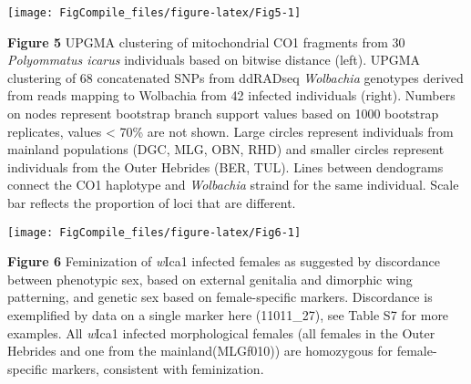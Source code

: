 \documentclass[12pt,]{article}
\begin{document}
\pagebreak

\begin{center}\texttt{[image: FigCompile\_files/figure-latex/Fig5-1]} \end{center}

\textbf{Figure 5} UPGMA clustering of mitochondrial CO1 fragments from
30 \emph{Polyommatus icarus} individuals based on bitwise distance
(left). UPGMA clustering of 68 concatenated SNPs from ddRADseq
\emph{Wolbachia} genotypes derived from reads mapping to Wolbachia from
42 infected individuals (right). Numbers on nodes represent bootstrap
branch support values based on 1000 bootstrap replicates, values
\textless{} 70\% are not shown. Large circles represent individuals from
mainland populations (DGC, MLG, OBN, RHD) and smaller circles represent
individuals from the Outer Hebrides (BER, TUL). Lines between dendograms
connect the CO1 haplotype and \emph{Wolbachia} straind for the same
individual. Scale bar reflects the proportion of loci that are
different.

\pagebreak

\begin{center}\texttt{[image: FigCompile\_files/figure-latex/Fig6-1]} \end{center}

\textbf{Figure 6} Feminization of \emph{w}Ica1 infected females as
suggested by discordance between phenotypic sex, based on external
genitalia and dimorphic wing patterning, and genetic sex based on
female-specific markers. Discordance is exemplified by data on a single
marker here (11011\_27), see Table S7 for more examples. All
\emph{w}Ica1 infected morphological females (all females in the Outer
Hebrides and one from the mainland(MLGf010)) are homozygous for
female-specific markers, consistent with feminization.
\end{document}
